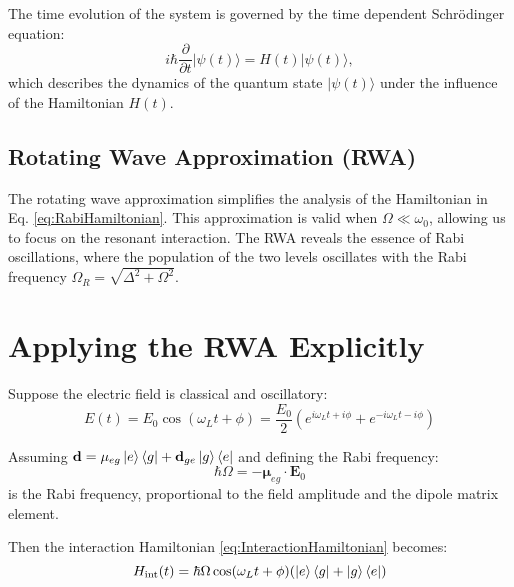 The time evolution of the system is governed by the time dependent Schrödinger equation:
\begin{equation}
	i\hbar \frac{\partial}{\partial t} |\psi(t)\rangle = H(t) |\psi(t)\rangle,
	\label{eq:SchrodingerEquation}
\end{equation}
which describes the dynamics of the quantum state \(|\psi(t)\rangle\) under the influence of the Hamiltonian \(H(t)\).


\subsection{Rotating Wave Approximation (RWA)}

The rotating wave approximation simplifies the analysis of the Hamiltonian in Eq. \eqref{eq:RabiHamiltonian}. 
This approximation is valid when \(\Omega \ll \omega_0\), allowing us to focus on the resonant interaction.
The RWA reveals the essence of Rabi oscillations, where the population of the two levels oscillates with the Rabi frequency \(\Omega_R = \sqrt{\Delta^2 + \Omega^2}\).

\section{Applying the RWA Explicitly}

Suppose the electric field is classical and oscillatory:
\begin{equation}
	E(t) = E_0 \cos(\omega_L t + \phi) = \frac{E_0}{2}\left(e^{i\omega_L t + i \phi} + e^{-i\omega_L t - i \phi}\right)
	\label{eq:ElectricField}
\end{equation}

Assuming \(\mathbf{d} = \mathbf{\mu}_{eg} \ket{e}\bra{g} + \mathbf{d}_{ge} \ket{g}\bra{e}\) and defining the Rabi frequency:
\begin{equation}
\hbar\Omega = -\mathbf{\mu}_{eg} \cdot \mathbf{E}_0
\end{equation}
is the Rabi frequency, proportional to the field amplitude and the dipole matrix element.

Then the interaction Hamiltonian \eqref{eq:InteractionHamiltonian} becomes:
\begin{equation}
	H_{\text{int}}(t) = \hbar\Omega \cos(\omega_L t + \phi) (\ket{e}\bra{g} + \ket{g}\bra{e})	
	\label{eq:InteractionHamiltonian_RABI}
\end{equation}

